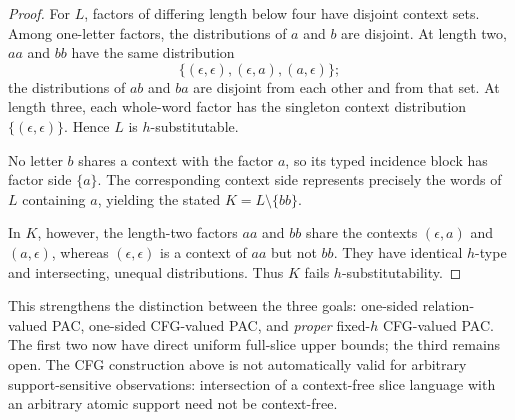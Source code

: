 \begin{proof}
For \(L\), factors of differing length below four
have disjoint context sets.  Among one-letter
factors, the distributions of \(a\) and \(b\)
are disjoint.  At length two, \(aa\) and \(bb\)
have the same distribution
\[
 \{(\epsilon,\epsilon),(\epsilon,a),(a,\epsilon)\};
\]
the distributions of \(ab\) and \(ba\) are
disjoint from each other and from that set.
At length three, each whole-word factor has
the singleton context distribution
\(\{(\epsilon,\epsilon)\}\).  Hence \(L\) is
\(h\)-substitutable.

No letter \(b\) shares a context with the
factor \(a\), so its typed incidence block
has factor side \(\{a\}\).  The corresponding
context side represents precisely the words
of \(L\) containing \(a\), yielding the stated
\(K=L\setminus\{bb\}\).

In \(K\), however, the length-two factors
\(aa\) and \(bb\) share the contexts
\((\epsilon,a)\) and \((a,\epsilon)\), whereas
\((\epsilon,\epsilon)\) is a context of
\(aa\) but not \(bb\).  They have identical
\(h\)-type and intersecting, unequal
distributions.  Thus \(K\) fails
\(h\)-substitutability.
\end{proof}

\begin{remark}
This strengthens the distinction between
the three goals: one-sided relation-valued
PAC, one-sided CFG-valued PAC, and
\emph{proper} fixed-\(h\) CFG-valued PAC.
The first two now have direct uniform
full-slice upper bounds; the third remains
open.  The CFG construction above is
not automatically valid for arbitrary
support-sensitive observations: intersection
of a context-free slice language with an
arbitrary atomic support need not be
context-free.
\end{remark}
